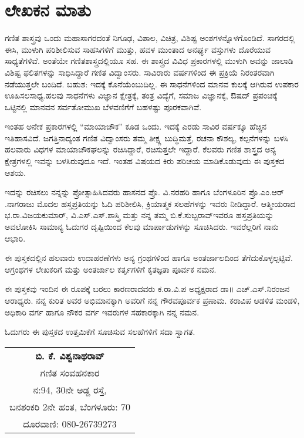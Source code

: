 \chapter*{ಲೇಖಕನ ಮಾತು}

\phantom{a}

\vskip  -1.2cm

\quad 
ಗಣಿತ ಶಾಸ್ತ್ರವು ಒಂದು ಮಹಾಸಾಗರದಂತೆ ನಿಗೂಢ, ವಿಶಾಲ, ವಿಚಿತ್ರ, ವಿಶಿಷ್ಟ ಅಂಶಗಳನ್ನೊಳಗೊಂಡಿದೆ. ಸಾಗರದಲ್ಲಿ ಈಸಿ, ಮುಳುಗಿ ಪರಿಶೀಲಿಸುವ ಸಾಹಸಿಗಳಿಗೆ ಮುತ್ತು, ಹವಳ ಮುಂತಾದ ಅನರ್ಘ್ಯ ವಸ್ತುಗಳು ದೊರೆಯುವ ಸಾಧ್ಯತೆಗಳಿವೆ. ಅಂತೆಯೇ ಗಣಿತಶಾಸ್ತ್ರದಲ್ಲಿಯೂ ಸಹ. ಈ ಶಾಸ್ತ್ರದ ವಿವಿಧ ಪ್ರಕಾರಗಳಲ್ಲಿ ಮುಳುಗಿ ಅವನ್ನು ಜಾಲಾಡಿ ವಿಶಿಷ್ಟ ಫಲಿತಗಳನ್ನು ಸಾಧಿಸಿದ್ದಾರೆ ಗಣಿತ ವಿದ್ವಾಂಸರು. ಸಾವಿರಾರು ವರ್ಷಗಳಿಂದ ಈ ಪ್ರಕ್ರಿಯೆ ನಿರಂತರವಾಗಿ ನಡೆಯುತ್ತಲೇ ಬಂದಿದೆ. ಬಹುಶ: ಇದಕ್ಕೆ ಕೊನೆಯೆಂಬುದಿಲ್ಲ. ಈ ಸಾಧನೆಗಳಿಂದ ಮಾನವ ಕುಲಕ್ಕೆ ಆಗಿರುವ ಉಪಕಾರ ಊಹಿಸಲಸಾಧ್ಯ.ಹಲವು ಸಾಧನೆಗಳು ವಿಜ್ಞಾನ ಕ್ಷೇತ್ರಕ್ಕೆ, ತಂತ್ರ ವಿದ್ಯೆಗೆ, ಸಮಾಜ ವಿಜ್ಞಾನಕ್ಕೆ, ಔಷದ್ ಪ್ರಪಂಚಕ್ಕೆ ಒಟ್ಟಿನಲ್ಲಿ ಮಾನವನ ಸರ್ವತೋಮುಖ ಬೆಳವಣಿಗೆಗೆ ಬಹಳಷ್ಟು ಪೂರಕವಾಗಿವೆ.

ಇಂತಹ ಅನೇಕ ಪ್ರಕಾರಗಳಲ್ಲಿ “ಮಾಯಾಚೌಕ” ಕೂಡ ಒಂದು. ಇದಕ್ಕೆ ಎರಡು ಸಾವಿರ ವರ್ಷಕ್ಕೂ ಹೆಚ್ಚಿನ ಇತಿಹಾಸವಿದೆ. ಜಗತ್ತಿನಾದ್ಯಂತ ಗಣಿತ ವಿದ್ವಾಂಸರು ತಮ್ಮ ತೀಕ್ಷ್ಣ ಬುದ್ಧಿಮತ್ತೆ, ರಚನಾ ಕೌಶಲ್ಯ, ಕಲ್ಪನೆಗಳನ್ನು ಬಳಸಿ ಹಲವಾರು ವಿಧಗಳ ಮಾಯಾಚೌಕಘಲನ್ನು ರಚಿಸಿದ್ದಾರೆ, ರಚಿಸುತ್ತಲೇ ಇದ್ದಾರೆ. ಕೆಲವರು ಗಣಿತ ಶಾಸ್ತ್ರದ ಅನ್ಯ ಕ್ಷೇತ್ರಗಳಲ್ಲಿ ಇವನ್ನು ಬಳಸಿರುವುದೂ ಇದೆ. ಇಂತಹ ವಿಷಯದ ಕಿರು ಪರಿಚಯ ಮಾಡಿಕೊಡುವುದು ಈ ಪುಸ್ತಕದ ಆಶಯ.

ಇದನ್ನು ರಚಿಸಲು ನನ್ನನ್ನು ಪ್ರೋತ್ಸಾಹಿಸಿದವರು  ಹಾಸನದ ಪ್ರೊ. ವಿ.ನರಹರಿ ಹಾಗೂ ಬೆಂಗಳೂರಿನ ಪ್ರೊ.ಎಂ.ಆರ್​.ನಾಗರಾಜು ಮೊದಲ ಹಸ್ತಪ್ರತಿಯನ್ನು ಓದಿ ಪರಿಶೀಲಿಸಿ, ಕ್ರಿಯಾತ್ಮಕ ಸಲಹೆಗಳನ್ನು ಇವರು ನೀಡಿದ್ದಾರೆ. ಆತ್ಮೀಯರಾದ ಭ.ರಾ.ವಿಜಯಕುಮಾರ್​, ವಿ.ಎಸ್​.ಎಸ್​.ಶಾಸ್ತ್ರಿ ಮತ್ತು ನನ್ನ ತಮ್ಮ ಬಿ.ಕೆ.ಸುಬ್ಬರಾವ್​ ಇವರೂ ಹಸ್ತಪ್ರತಿಯನ್ನು ಅವಲೋಕಿಸಿ ಸಾಮಾನ್ಯ ಓದುಗರ ದೃಷ್ಟಿಯಿಂದ ಕೆಲವು ಮಾರ್ಪಾಡುಗಳನ್ನು ಸೂಚಿಸಿದರು. ಇವರೆಲ್ಲರಿಗೆ ನಾನು ಆಭಾರಿ.

ಈ ಪುಸ್ತಕದಲ್ಲಿನ ಹಲವಾರು ಉದಾಹರಣೆಗಳು ಅನ್ಯ ಗ್ರಂಥಗಳಿಂದ ಹಾಗೂ ಅಂತರ್ಜಾಲದಿಂದ ತೆಗೆದುಕೊಳ್ಳಲ್ಪಟ್ಟಿವೆ. ಆಗ್ರಂಥಗಳ ಲೇಖಕರಿಗೆ ಮತ್ತು ಅಂತರ್ಜಾಲ ಕರ್ತೃಗಳಿಗೆ ಕೃತಜ್ಞತಾ ಪೂರ್ವಕ ನಮನ.

ಈ ಪುಸ್ತಕವು ಇಂದಿನ ಈ ರೂಪಕ್ಕೆ ಬರಲು ಕಾರಣರಾದವರು ಕ.ರಾ.ವಿ.ಪ ಅಧ್ಯಕ್ಷರಾದ ಡಾ॥ ಎಚ್​.ಎಸ್​.ನಿರಂಜನ ಆರಾಧ್ಯರು. ನನ್ನ ಕುರಿತ ಅವರ ಅಭಿಮಾನಕ್ಕಾಗಿ ಅವರಿಗೆ ನನ್ನ ಗೌರವಪೂರ್ವಕ ಪ್ರಣಾಮ. ಕರಾವಿಪ ಆಡಳಿತ ಮಂಡಳಿ, ಅಧಿಕಾರಿ ವರ್ಗ ಹಾಗೂ ನೌಕರ ವರ್ಗ ಇವರುಗಳ ಸಹಕಾರಕ್ಕಾಗಿ ನನ್ನ ನಮನ.

ಓದುಗರು ಈ ಪುಸ್ತಕದ ಉತ್ತಮಿಕೆಗೆ ಸೂಚಿಸುವ ಸಲಹೆಗಳಿಗೆ ಸದಾ ಸ್ವಾಗತ.

\begin{flushright}
\begin{tabular}{c}
{\bf ಬಿ. ಕೆ. ವಿಶ್ವನಾಥರಾವ್}\\
ಗಣಿತ ಸಂವಹನಕಾರ\\
ನ:{\rm 94}, {\rm 30}ನೇ ಅಡ್ಡ ರಸ್ತೆ, \\
ಬನಶಂಕರಿ {\rm 2}ನೇ ಹಂತ, ಬೆಂಗಳೂರು: {\rm 70}\\
ದೂರವಾಣಿ: {\rm 080-26739273}
\end{tabular}
\end{flushright}
